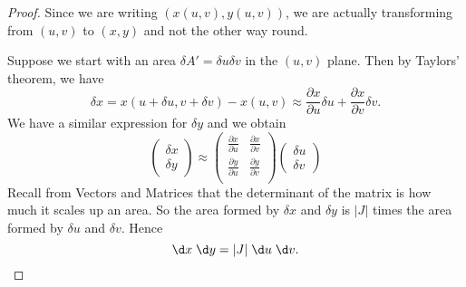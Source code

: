 \documentclass[a4paper]{article}
\begin{document}
\begin{proof}
  Since we are writing $(x(u, v), y(u, v))$, we are actually transforming from $(u, v)$ to $(x, y)$ and not the other way round.

  Suppose we start with an area $\delta A' = \delta u\delta v$ in the $(u, v)$ plane. Then by Taylors' theorem, we have
  \[
    \delta x = x(u + \delta u, v + \delta v) - x(u, v) \approx \frac{\partial x}{\partial u}\delta u + \frac{\partial x}{\partial v}\delta v.
  \]
  We have a similar expression for $\delta y$ and we obtain
  \[
    \begin{pmatrix}
      \delta x\\
      \delta y
    \end{pmatrix}
    \approx
    \begin{pmatrix}
      \frac{\partial x}{\partial u} & \frac{\partial x}{\partial v}\\
      \frac{\partial y}{\partial u} & \frac{\partial y}{\partial v}\\
    \end{pmatrix}
    \begin{pmatrix}
      \delta u\\
      \delta v
    \end{pmatrix}
  \]
  Recall from Vectors and Matrices that the determinant of the matrix is how much it scales up an area. So the area formed by $\delta x$ and $\delta y$ is $|J|$ times the area formed by $\delta u$ and $\delta v$. Hence
  \[
    \d x\;\d y = |J| \;\d u\;\d v.\qedhere
  \]
\end{proof}
\end{document}
